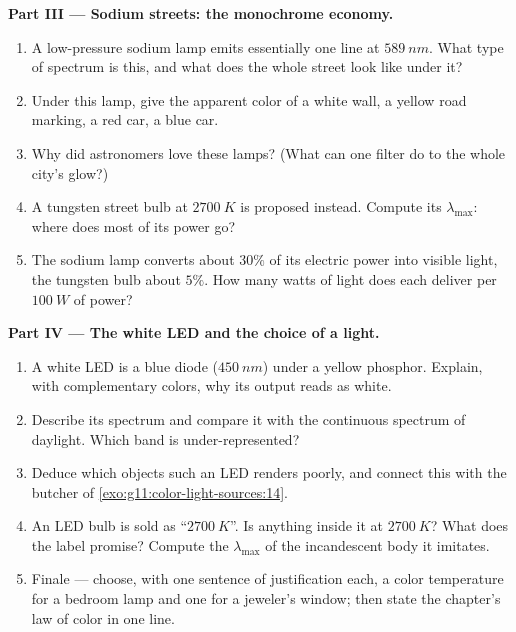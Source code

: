 \begin{problem}
\medskip
\noindent\textbf{Part III --- Sodium streets: the monochrome economy.}
\begin{enumerate}[resume]
  \item A low-pressure sodium lamp emits essentially one line at
        $\qty{589}{nm}$. What type of spectrum is this, and what does
        the whole street look like under it?
  \item Under this lamp, give the apparent color of a white wall, a
        yellow road marking, a red car, a blue car.
  \item Why did astronomers love these lamps? (What can one filter do
        to the whole city's glow?)
  \item A tungsten street bulb at $\qty{2700}{K}$ is proposed instead.
        Compute its $\lambda_{\max}$: where does most of its power go?
  \item The sodium lamp converts about $30\%$ of its electric power
        into visible light, the tungsten bulb about $5\%$. How many
        watts of light does each deliver per $\qty{100}{W}$ of power?
\end{enumerate}

\medskip
\noindent\textbf{Part IV --- The white LED and the choice of a light.}
\begin{enumerate}[resume]
  \item A white LED is a blue diode ($\qty{450}{nm}$) under a yellow
        phosphor. Explain, with complementary colors, why its output
        reads as white.
  \item Describe its spectrum and compare it with the continuous
        spectrum of daylight. Which band is under-represented?
  \item Deduce which objects such an LED renders poorly, and connect
        this with the butcher of \cref{exo:g11:color-light-sources:14}.
  \item An LED bulb is sold as ``$\qty{2700}{K}$''. Is anything inside
        it at $\qty{2700}{K}$? What does the label promise? Compute the
        $\lambda_{\max}$ of the incandescent body it imitates.
  \item Finale --- choose, with one sentence of justification each, a
        color temperature for a bedroom lamp and one for a jeweler's
        window; then state the chapter's law of color in one line.
\end{enumerate}
\end{problem}
